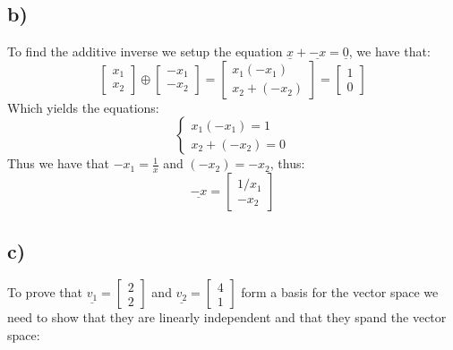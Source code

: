 \documentclass{article}
\begin{document}
\subsection*{b)}
To find the additive inverse we setup the equation $\underline{x}+\underline{-x}=\underline{0}$, we have that:
$$\begin{bmatrix} 
x_{1}\\x_{2}
\end{bmatrix}\oplus\begin{bmatrix} 
-x_{1}\\
-x_{2}
\end{bmatrix}=\begin{bmatrix} 
x_{1}(-x_{1})\\
x_{2}+(-x_{2})
\end{bmatrix}=\begin{bmatrix} 
1\\0
\end{bmatrix}$$
Which yields the equations: $$\begin{cases}
x_{1}(-x_{1})=1\\
x_{2}+(-x_{2})=0
\end{cases}$$
Thus we have that $-x_{1}=\frac{1}{x}$ and $(-x_{2})=-x_{2}$, thus:$$
\underline{-x}=\begin{bmatrix} 
1/x_{1}\\-x_{2}
\end{bmatrix}$$
\subsection*{c)}
To prove that $\underline{v_{1}}=\begin{bmatrix} 
2\\2
\end{bmatrix}$ and $\underline{v_{2}}=\begin{bmatrix} 
4\\1
\end{bmatrix}$ form a basis for the vector space we need to show that they are linearly independent and that they spand the vector space:
\end{document}
